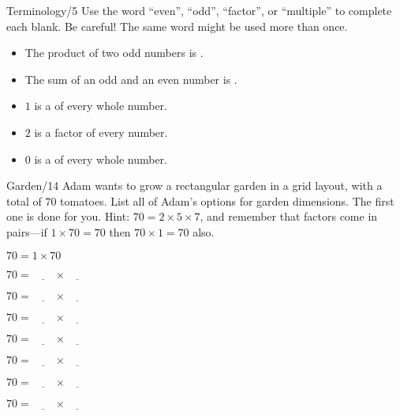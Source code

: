 \documentclass[12pt,letterpaper]{article}
\begin{document}
\begin{problem}{Terminology\hfill/5}
 Use the word ``even'', ``odd'', ``factor'', or ``multiple'' to complete each
 blank. Be careful! The same word might be used more than once.

 \begin{itemize}
  \item The product of two odd numbers is \underline{\hspace{6em}}.
  \item The sum of an odd and an even number is \underline{\hspace{6em}}.
  \item $1$ is a \underline{\hspace{6em}} of every whole number.
  \item $2$ is a factor of every \underline{\hspace{6em}} number.
  \item $0$ is a \underline{\hspace{6em}} of every whole number.
 \end{itemize}
\end{problem}

\begin{problem}{Garden\hfill/14}
 Adam wants to grow a rectangular garden in a grid layout, with a total
 of $70$ tomatoes. List all of Adam's options for garden dimensions.
 The first one is done for you. Hint: $70=2\times5\times7$, and remember
 that factors come in pairs---if $1 \times 70 = 70$ then $70 \times 1 = 70$
 also.

 \begin{itemize}
  \begin{multicols}{2}
    \item $70 = 1 \times 70$
    \item $70 = \underline{\hspace{2em}} \times \underline{\hspace{2em}}$
    \item $70 = \underline{\hspace{2em}} \times \underline{\hspace{2em}}$
    \item $70 = \underline{\hspace{2em}} \times \underline{\hspace{2em}}$
    \item $70 = \underline{\hspace{2em}} \times \underline{\hspace{2em}}$
    \item $70 = \underline{\hspace{2em}} \times \underline{\hspace{2em}}$
    \item $70 = \underline{\hspace{2em}} \times \underline{\hspace{2em}}$
    \item $70 = \underline{\hspace{2em}} \times \underline{\hspace{2em}}$
  \end{multicols}
 \end{itemize}
\end{problem}
\end{document}
